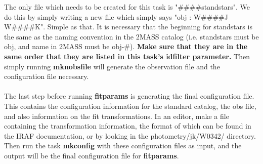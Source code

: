 \documentclass[a4paper]{article}
\begin{document}
The only file which needs to be created for this task is "\#\#\#\#standstars".  We do this by simply writing a new file which simply says "obj : W\#\#\#\#J W\#\#\#\#K".  Simple as that.  It is necessary that the beginning for standstars is the same as the naming convention in the 2MASS catalog (i.e. standstars must be obj, and name in 2MASS must be obj-\#).  \textbf{Make sure that they are in the same order that they are listed in this task's idfilter parameter.}  Then simply running \textbf{mknobsfile} will generate the observation file and the configuration file necessary.  \\ \\
The last step before running \textbf{fitparams} is generating the final configuration file.  This contains the configuration information for the standard catalog, the obs file, and also information on the fit transformations.  In an editor, make a file containing the transformation information, the format of which can be found in the IRAF documentation, or by looking in the photometry/jk/W0342/ directory.  Then run the task \textbf{mkconfig} with these configuration files as input, and the output will be the final configuration file for \textbf{fitparams}.
\end{document}

